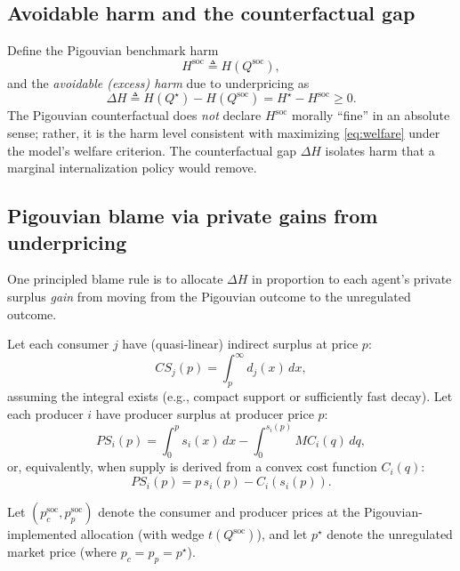 \documentclass[journal, a4paper]{IEEEtran}
\begin{document}
\subsection{Avoidable harm and the counterfactual gap}
Define the Pigouvian benchmark harm
\begin{equation}
H^{\text{soc}} \triangleq H(Q^{\text{soc}}),
\end{equation}
and the \emph{avoidable (excess) harm} due to underpricing as
\begin{equation}
\Delta H \triangleq H(Q^\star)-H(Q^{\text{soc}})=H^\star-H^{\text{soc}} \ge 0.
\label{eq:deltaH}
\end{equation}
The Pigouvian counterfactual does \emph{not} declare $H^{\text{soc}}$ morally ``fine'' in an absolute sense; rather, it is the harm level consistent with maximizing \eqref{eq:welfare} under the model's welfare criterion. The counterfactual gap $\Delta H$ isolates harm that a marginal internalization policy would remove.

\subsection{Pigouvian blame via private gains from underpricing}
One principled blame rule is to allocate $\Delta H$ in proportion to each agent's private surplus \emph{gain} from moving from the Pigouvian outcome to the unregulated outcome.

Let each consumer $j$ have (quasi-linear) indirect surplus at price $p$:
\begin{equation}
CS_j(p)=\int_{p}^{\infty} d_j(x)\,dx,
\label{eq:cs}
\end{equation}
assuming the integral exists (e.g., compact support or sufficiently fast decay). Let each producer $i$ have producer surplus at producer price $p$:
\begin{equation}
PS_i(p)=\int_{0}^{p} s_i(x)\,dx - \int_0^{s_i(p)} MC_i(q)\,dq,
\end{equation}
or, equivalently, when supply is derived from a convex cost function $C_i(q)$:
\begin{equation}
PS_i(p)=p\,s_i(p)-C_i(s_i(p)).
\label{eq:pscost}
\end{equation}

Let $(p_c^{\text{soc}},p_p^{\text{soc}})$ denote the consumer and producer prices at the Pigouvian-implemented allocation (with wedge $t(Q^{\text{soc}})$), and let $p^\star$ denote the unregulated market price (where $p_c=p_p=p^\star$).
\end{document}
